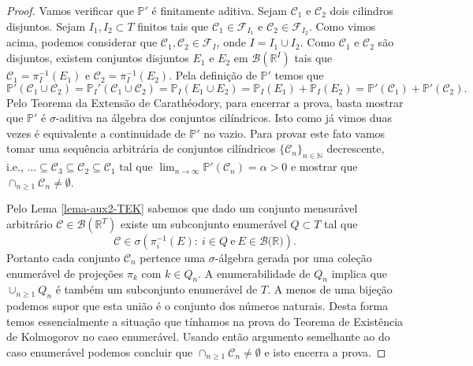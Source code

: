 \begin{proof}
Vamos verificar que $\mathbb{P}'$ é finitamente aditiva.
Sejam $\mathcal{C}_1$ e $\mathcal{C}_2$ dois cilindros 
disjuntos. Sejam $I_1,I_2\subset T$ finitos 
tais que $\mathcal{C}_1\in \mathcal{F}_{I_1}$ e 
$\mathcal{C}_2\in \mathcal{F}_{I_2}$. Como vimos 
acima, podemos considerar que $\mathcal{C}_1,\mathcal{C}_2\in \mathcal{F}_{I}$,
onde $I=I_1\cup I_2$. 
Como $\mathcal{C}_1$ e $\mathcal{C}_2$ são disjuntos, 
existem conjuntos disjuntos $E_1$ e $E_2$ em 
$\mathscr{B}(\mathbb{R}^I)$ 
tais que $\mathcal{C}_1 = \pi_{I}^{-1}(E_1)$ e 
$\mathcal{C}_2 = \pi_{I}^{-1}(E_2)$.
Pela definição de $\mathbb{P}'$ temos que 
\[
\mathbb{P}'(\mathcal{C}_1\cup \mathcal{C}_2)
=
\mathbb{P}_I'(\mathcal{C}_1\cup \mathcal{C}_2)
=
\mathbb{P}_I(E_1\cup E_2)
=
\mathbb{P}_I(E_1)+ \mathbb{P}_I(E_2)
=
\mathbb{P}'(\mathcal{C}_1) + \mathbb{P}'(\mathcal{C}_2).
\] 
Pelo Teorema da Extensão de Carathéodory, 
para encerrar a prova, basta mostrar que
$\mathbb{P}'$ é $\sigma$-aditiva na álgebra dos conjuntos
cilíndricos. Isto como já vimos duas vezes é equivalente 
a continuidade de $\mathbb{P}'$ no vazio. 
Para provar este fato vamos tomar uma sequência arbitrária
de conjuntos cilíndricos $\{\mathcal{C}_n\}_{n\in\mathbb{N}}$
decrescente, i.e.,
$\ldots \subseteq \mathcal{C}_3\subseteq \mathcal{C}_2\subseteq \mathcal{C}_1$
tal que $\lim_{n\to\infty} \mathbb{P}'(\mathcal{C}_n)=\alpha>0$
e mostrar que $\cap_{n\geq 1} \mathcal{C}_n \neq \emptyset$.


Pelo Lema \ref{lema-aux2-TEK} sabemos que dado um conjunto mensurável 
arbitrário $\mathcal{C}\in \mathscr{B}(\mathbb{R}^{T})$ 
existe um subconjunto enumerável $Q\subset T$ 
tal que 
\[
\mathcal{C}\in 
\sigma\left(
\pi^{-1}_{i}(E):
\ i\in Q \ 
\text{e}\ 
E\in\mathscr{B}\big(\mathbb{R}\big)
\right).
\]
Portanto cada conjunto $\mathcal{C}_n$ pertence uma 
$\sigma$-álgebra gerada por uma coleção enumerável 
de projeções $\pi_k$ com $k\in Q_n$. 
A enumerabilidade de $Q_n$ implica que $\cup_{n\geq 1} Q_n$
é também um subconjunto enumerável de $T$. 
A menos de uma bijeção podemos supor que 
esta união é o conjunto dos números naturais.
Desta forma temos essencialmente a situação que tínhamos
na prova do Teorema de Existência de Kolmogorov no 
caso enumerável. Usando então argumento semelhante 
ao do caso enumerável podemos concluir que 
$\cap_{n\geq 1} \mathcal{C}_n \neq \emptyset$ e 
isto encerra a prova.
\end{proof}